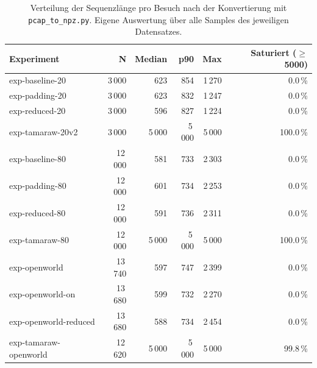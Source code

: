 \begin{table}[H]
    \centering
    \caption{Verteilung der Sequenzlänge pro Besuch nach der Konvertierung mit \texttt{pcap\_to\_npz.py}. Eigene Auswertung über alle Samples des jeweiligen Datensatzes.}
    \label{tab:eval_seqlen}
    \begin{tabular}{lrrrrr}
        \hline
        Experiment & N & Median & p90 & Max & Saturiert ($\geq$5000) \\
        \hline
        exp-baseline-20       &  3\,000 &    623 &    854 & 1\,270 &   0.0\,\% \\
        exp-padding-20        &  3\,000 &    623 &    832 & 1\,247 &   0.0\,\% \\
        exp-reduced-20        &  3\,000 &    596 &    827 & 1\,224 &   0.0\,\% \\
        exp-tamaraw-20v2      &  3\,000 & 5\,000 & 5\,000 & 5\,000 & 100.0\,\% \\
        exp-baseline-80       & 12\,000 &    581 &    733 & 2\,303 &   0.0\,\% \\
        exp-padding-80        & 12\,000 &    601 &    734 & 2\,253 &   0.0\,\% \\
        exp-reduced-80        & 12\,000 &    591 &    736 & 2\,311 &   0.0\,\% \\
        exp-tamaraw-80        & 12\,000 & 5\,000 & 5\,000 & 5\,000 & 100.0\,\% \\
        exp-openworld         & 13\,740 &    597 &    747 & 2\,399 &   0.0\,\% \\
        exp-openworld-on      & 13\,680 &    599 &    732 & 2\,270 &   0.0\,\% \\
        exp-openworld-reduced & 13\,680 &    588 &    734 & 2\,454 &   0.0\,\% \\
        exp-tamaraw-openworld & 12\,620 & 5\,000 & 5\,000 & 5\,000 &  99.8\,\% \\
        \hline
    \end{tabular}
\end{table}
